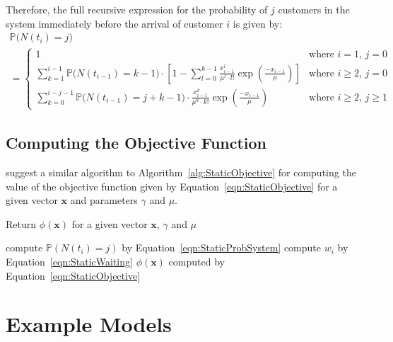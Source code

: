 Therefore, the full recursive expression for the probability of $j$ customers in the system immediately before the arrival of customer $i$ is given by:
\begin{multline}
	\mathbb{P} \Big( N (t_{i}) = j \Big) \\
	= \begin{cases} 1 & \text{where $i = 1$, $j = 0$} \\ \sum_{k = 1}^{i - 1} \mathbb{P} \Big( N (t_{i - 1}) = k - 1 \Big) \cdot \left[ 1 - \sum_{l = 0}^{k - 1} \frac{x_{i - 1}^{l}}{\mu^{l} \cdot l!} \exp \left( \frac{- x_{i - 1}}{\mu} \right) \right] & \text{where $i \geq 2$, $j = 0$} \\ \sum_{k = 0}^{i - j - 1} \mathbb{P} \Big( N (t_{i - 1}) = j + k - 1 \Big) \cdot \frac{x_{i - 1}^{k}}{\mu^{k} \cdot k!} \exp \left( \frac{- x_{i - 1}}{\mu} \right) & \text{where $i \geq 2$, $j \geq 1$} \end{cases}
	\label{eqn:StaticProbSystem}
\end{multline}

\subsection{Computing the Objective Function}

\citet{Pegden} suggest a similar algorithm to Algorithm~\ref{alg:StaticObjective} for computing the value of the objective function given by Equation~\ref{eqn:StaticObjective} for a given vector $\mathbf{x}$ and parameters $\gamma$ and $\mu$.
\begin{algorithm}[htb]
\caption{Return $\phi (\mathbf{x})$ for a given vector $\mathbf{x}$, $\gamma$ and $\mu$}
\begin{algorithmic}
    		\State compute $\mathbb{P} \left( N (t_{i}) = j \right)$ by Equation~\ref{eqn:StaticProbSystem}
    	\EndFor
    \EndFor
    	\State compute $w_{i}$ by Equation~\ref{eqn:StaticWaiting}
    \EndFor
    \State \Return $\phi (\mathbf{x})$ computed by Equation~\ref{eqn:StaticObjective}
\EndFunction
\end{algorithmic}
\label{alg:StaticObjective}
\end{algorithm}

\section{Example Models}
